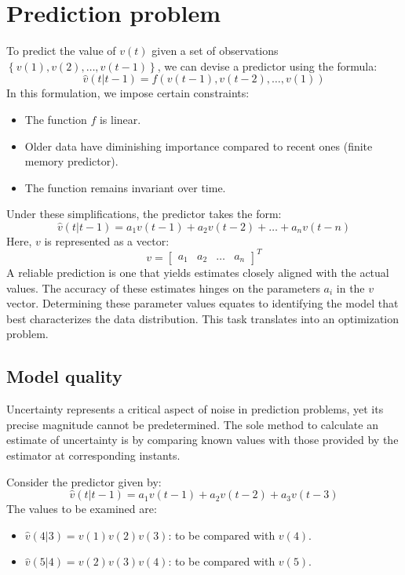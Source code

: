 \section{Prediction problem}

To predict the value of $v(t)$ given a set of observations $\left\{v(1), v(2),\dots, v(t-1)\right\}$, we can devise a predictor using the formula:
\[\hat{v}(t | t-1)=f\left(v(t-1), v(t-2),\dots, v(1)\right)\]
In this formulation, we impose certain constraints:
\begin{itemize}
    \item The function $f$ is linear. 
    \item Older data have diminishing importance compared to recent ones (finite memory predictor).
    \item The function remains invariant over time.
\end{itemize}
Under these simplifications, the predictor takes the form:
\[\hat{v}(t | t-1)=a_1v(t-1)+a_2v(t-2)+\dots+a_nv(t-n)\]
Here, $v$ is represented as a vector:
\[v=\begin{bmatrix} a_1 & a_2 & \dots & a_n \end{bmatrix}^T\]
A reliable prediction is one that yields estimates closely aligned with the actual values.
The accuracy of these estimates hinges on the parameters $a_i$ in the $v$ vector. 
Determining these parameter values equates to identifying the model that best characterizes the data distribution. 
This task translates into an optimization problem.

\subsection{Model quality}
Uncertainty represents a critical aspect of noise in prediction problems, yet its precise magnitude cannot be predetermined.
The sole method to calculate an estimate of uncertainty is by comparing known values with those provided by the estimator at corresponding instants.
\begin{example}
    Consider the predictor given by:
    \[\hat{v}(t | t-1)=a_1v(t-1)+a_2v(t-2)+a_3v(t-3)\]
    The values to be examined are:
    \begin{itemize}
        \item $\hat{v}(4 | 3)=v(1)v(2)v(3)$: to be compared with $v(4)$.
        \item $\hat{v}(5 | 4)=v(2)v(3)v(4)$: to be compared with $v(5)$.
    \end{itemize}
\end{example}

